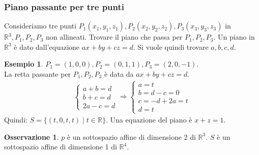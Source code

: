 \documentclass[a4paper]{article}
\theoremstyle{definition}
\newtheorem*{oss}{Osservazione}
\newtheorem*{es}{Esempio}
\begin{document}
	\subsubsection{Piano passante per tre punti}
	Consideriamo tre punti $P_1(x_1, y_1, z_1), P_2(x_2, y_2, z_2), P_3(x_3, y_3, z_3)$ in $\mathbb{R}^3, P_1, P_2, P_3$ non allineati.
	Trovare il piano che passa per $P_1, P_2, P_3$.
	Un piano in $\mathbb{R}^3$ è dato dall'equazione $ax + by + cz = d$. Si vuole quindi trovare $a, b, c, d$.
	\begin{es}
		$P_1 = (1, 0, 0), P_2 = (0, 1, 1), P_3 = (2, 0, -1)$. \\
		La retta passante per $P_1, P_2, P_3$ è data da $ax + by + cz = d$.
		\begin{align*}
			\begin{cases}
				a + b = d \\
				b + c = d \\
				2a - c = d
			\end{cases} \Rightarrow \begin{cases}
				a = t \\
				b = d - c = 0 \\
				c = - d + 2a = t \\
				d = t
			\end{cases}
		\end{align*}
		Quindi: $S = \{(t, 0, t, t) \mid t \in \mathbb{R}\}$. Una equazione del piano è $x + z = 1$.
		\begin{oss}
			$p$ è un sottospazio affine di dimensione 2 di $\mathbb{R}^3$. $S$ è un sottospazio affine di dimensione 1 di $\mathbb{R}^4$.
		\end{oss}
	\end{es}
\end{document}
